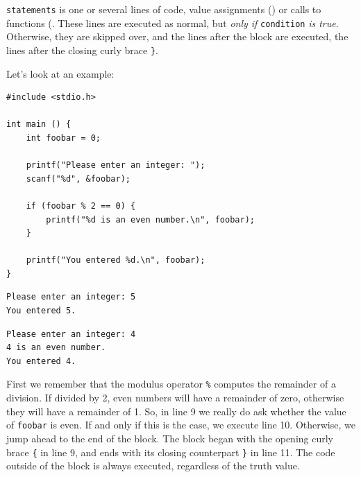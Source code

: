 \texttt{statements} is one or several lines of code, \eg value assignments () or calls to functions (. These lines are executed as normal, but \emph{only if} \texttt{condition} \emph{is true}. Otherwise, they are skipped over, and the lines after the  block are executed, \ie the lines after the closing curly brace \texttt{\}}.

Let's look at an example:
\begin{codebox}[evenNumbers.c]
\begin{verbatim}
#include <stdio.h>

int main () {
    int foobar = 0;

    printf("Please enter an integer: ");
    scanf("%d", &foobar);

    if (foobar % 2 == 0) {
        printf("%d is an even number.\n", foobar);
    }

    printf("You entered %d.\n", foobar);
}
\end{verbatim}
\end{codebox}

\begin{tcbraster}[raster columns=2,
                  raster equal height,
                  nobeforeafter,
                  raster column skip=0.2cm]
\begin{cmdbox}
\begin{verbatim}
Please enter an integer: 5
You entered 5.
\end{verbatim}
\end{cmdbox}
%
\begin{cmdbox}
\begin{verbatim}
Please enter an integer: 4
4 is an even number.
You entered 4.
\end{verbatim}
\end{cmdbox}
\end{tcbraster}

First we remember that the modulus operator \texttt{\%} computes the remainder of a division. If divided by 2, even numbers will have a remainder of zero, otherwise they will have a remainder of 1. So, in line 9 we really do ask whether the value of \texttt{foobar} is even. If and only if this is the case, we execute line 10. Otherwise, we jump ahead to the end of the  block. The block began with the opening curly brace \texttt{\{} in line 9, and ends with its closing counterpart \texttt{\}} in line 11. The code outside of the  block is always executed, regardless of the truth value.

